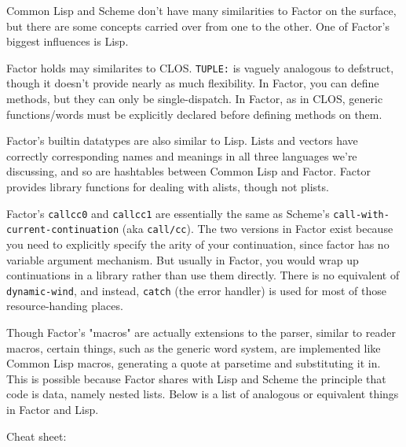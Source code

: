 \documentclass{article}
\begin{document}
Common Lisp and Scheme don't have many similarities to Factor on the surface, but there are some concepts carried over from one to the other. One of Factor's biggest influences is Lisp.

Factor holds may similarites to CLOS. \texttt{TUPLE:} is vaguely analogous to defstruct, though it doesn't provide nearly as much flexibility. In Factor, you can define methods, but they can only be single-dispatch. In Factor, as in CLOS, generic functions/words must be explicitly declared before defining methods on them.

Factor's builtin datatypes are also similar to Lisp. Lists and vectors have correctly corresponding names and meanings in all three languages we're discussing, and so are hashtables between Common Lisp and Factor. Factor provides library functions for dealing with alists, though not plists.

Factor's \texttt{callcc0} and \texttt{callcc1} are essentially the same as Scheme's \texttt{call-with-current-continuation} (aka \texttt{call/cc}). The two versions in Factor exist because you need to explicitly specify the arity of your continuation, since factor has no variable argument mechanism. But usually in Factor, you would wrap up continuations in a library rather than use them directly. There is no equivalent of \texttt{dynamic-wind}, and instead, \texttt{catch} (the error handler) is used for most of those resource-handing places.

Though Factor's "macros" are actually extensions to the parser, similar to reader macros, certain things, such as the generic word system, are implemented like Common Lisp macros, generating a quote at parsetime and substituting it in. This is possible because Factor shares with Lisp and Scheme the principle that code is data, namely nested lists. Below is a list of analogous or equivalent things in Factor and Lisp.

Cheat sheet:
\end{document}
